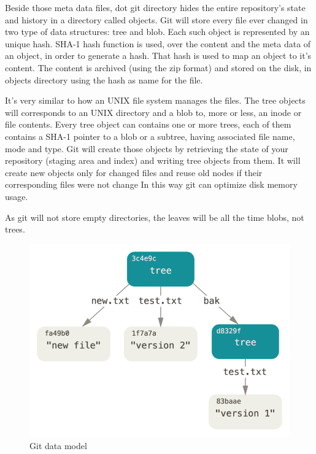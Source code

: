         Beside those meta data files, dot git directory hides the entire repository's state and history in a directory called objects. Git will store every file ever changed in two type of data structures: tree and blob. Each such object is represented by an unique hash. SHA-1 hash function is used, over the content and the meta data of an object, in order to generate a hash. That hash is used to map an object to it's content. The content is archived (using the zip format) and stored on the disk, in objects directory using the hash as name for the file.
        
        It's very similar to how an UNIX file system manages the files. The tree objects will corresponds to an UNIX directory and a blob to, more or less, an inode or file contents. Every tree object can contains one or more trees, each of them contains a SHA-1 pointer to a blob or a subtree, having associated file name, mode and type. Git will create those objects by retrieving the state of your repository (staging area and index) and writing tree objects from them. It will create new objects only for changed files and reuse old nodes if their corresponding files were not change In this way git can optimize disk memory usage.
        
        As git will not store empty directories, the leaves will be all the time blobs, not trees.
        
        \begin{figure}[h]
           \begin{center}
               \includegraphics[width=15cm]{theoretical/data-model-2.png}
            \end{center}
            \label{fig:git-objects}\caption{Git data model}
        \end{figure}
        
